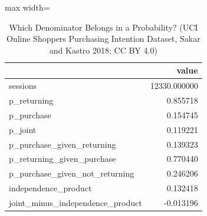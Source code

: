 \begin{table}[htbp]
\centering
\caption{Which Denominator Belongs in a Probability? (UCI Online Shoppers Purchasing Intention Dataset, Sakar and Kastro 2018; CC BY 4.0)}
\begingroup
\small
\setlength{\tabcolsep}{6pt}
\renewcommand{\arraystretch}{1.12}
\begin{adjustbox}{max width=\linewidth}
\begin{tabular}{@{}lr@{}}
\toprule
 & value \\
\midrule
sessions & 12330.000000 \\
p\_returning & 0.855718 \\
p\_purchase & 0.154745 \\
p\_joint & 0.119221 \\
p\_purchase\_given\_returning & 0.139323 \\
p\_returning\_given\_purchase & 0.770440 \\
p\_purchase\_given\_not\_returning & 0.246206 \\
independence\_product & 0.132418 \\
joint\_minus\_independence\_product & -0.013196 \\
\bottomrule
\end{tabular}
\end{adjustbox}
\endgroup
\end{table}